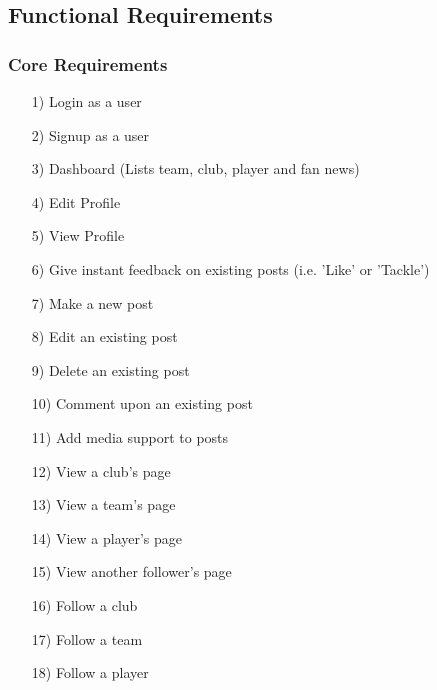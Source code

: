 \documentclass[10pt,a4paper]{article}
\begin{document}
\subsection{Functional Requirements}

\subsubsection{Core Requirements}
\begin{itemize}

\item[1)]
Login as a user

\item[2)]
Signup as a user

\item[3)]
Dashboard (Lists team, club, player and fan news)

\item[4)]
Edit Profile

\item[5)]
View Profile

\item[6)]
Give instant feedback on existing posts (i.e. 'Like' or 'Tackle')

\item[7)]
Make a new post

\item[8)]
Edit an existing post

\item[9)]
Delete an existing post

\item[10)]
Comment upon an existing post

\item[11)]
Add media support to posts

\item[12)]
View a club's page

\item[13)]
View a team's page

\item[14)]
View a player's page

\item[15)]
View another follower's page

\item[16)]
Follow a club

\item[17)]
Follow a team

\item[18)]
Follow a player


\end{itemize}
\end{document}
